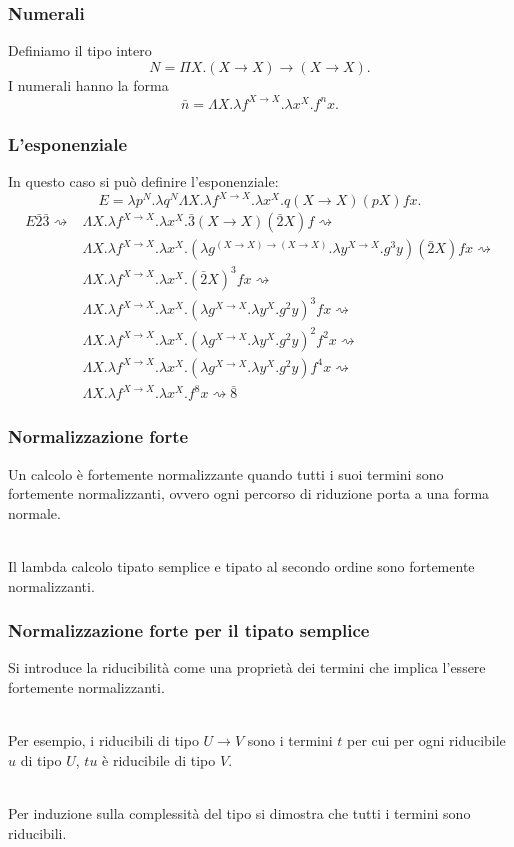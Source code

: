 \documentclass[aspectratio=43]{beamer}
\renewcommand{\l}{\lambda}
\renewcommand{\L}{\Lambda}
\newcommand{\conv}{\rightsquigarrow}
\newcommand{\ar}{\rightarrow}
\newcommand{\rar}{\rightarrow}
\begin{document}
\begin{frame}
    \frametitle{Numerali}
    Definiamo il tipo intero
    \[
        N = \Pi X. (X\ar X)\ar (X\ar X).
    \]
    I numerali hanno la forma
    \[
        \bar{n} = \L X. \l f^{X\ar X}. \l x^X. f^nx.
    \]
\end{frame}

\begin{frame}
    \frametitle{L'esponenziale}
    In questo caso si pu\`o definire l'esponenziale:
    \[
        E = \l p^N. \l q^N \L X. \l f^{X\ar X}. \l x^X. q(X\ar X) (pX) fx. 
    \]
    \begin{align*}
        E\bar{2}\bar{3} \conv &\L X. \l f^{X\ar X}. \l x^X. \bar{3}(X\ar X)
            (\bar{2}X) f \conv \\
        &\L X. \l f^{X\ar X}. \l x^X. (\l g^{(X\ar X)\ar (X\ar X)}. \l y^{X\ar X}
            . g^3 y) (\bar{2}X) fx \conv \\
        &\L X. \l f^{X\ar X}. \l x^X.  (\bar{2}X)^3 fx \conv \\
        &\L X. \l f^{X\ar X}.  \l x^X. (\l g^{X\ar X}.\l y^X. g^2 y)^3 fx \conv
            \\
        &\L X. \l f^{X\ar X}. \l x^X. (\l g^{X\ar X}.\l y^X. g^2 y)^2 f^2 x \conv
            \\
        &\L X. \l f^{X\ar X}. \l x^X. (\l g^{X\ar X}.\l y^X. g^2 y) f^4 x \conv
            \\
        &\L X. \l f^{X\ar X}. \l x^X. f^8 x \conv \bar{8}
    \end{align*}
\end{frame}

\begin{frame}
    \frametitle{Normalizzazione forte}
    Un calcolo \`e fortemente normalizzante quando tutti i suoi termini sono
    fortemente normalizzanti, ovvero ogni percorso di riduzione porta a una
    forma normale.
    \\~\

    Il lambda calcolo tipato semplice e tipato al secondo ordine sono fortemente
    normalizzanti.
\end{frame}

\begin{frame}
    \frametitle{Normalizzazione forte per il tipato semplice}
    Si introduce la riducibilit\`a come una propriet\`a dei termini che implica
    l'essere fortemente normalizzanti.
    \\~\ 

    Per esempio, i riducibili di tipo $U\rar V$ sono i termini $t$ per cui per
    ogni riducibile $u$ di tipo $U$, $tu$ \`e riducibile di tipo $V$.
    \\~\

    Per induzione sulla complessit\`a del tipo si dimostra che tutti i termini
    sono riducibili.
\end{frame}
\end{document}
